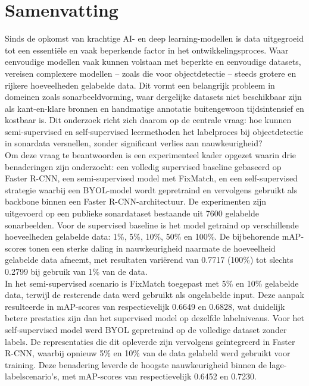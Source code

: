 
\chapter*{Samenvatting}

Sinds de opkomst van krachtige AI- en deep learning-modellen is data uitgegroeid tot een essentiële en vaak beperkende factor in het ontwikkelingsproces. Waar eenvoudige modellen vaak kunnen volstaan met beperkte en eenvoudige datasets, vereisen complexere modellen -- zoals die voor objectdetectie -- steeds grotere en rijkere hoeveelheden gelabelde data. Dit vormt een belangrijk probleem in domeinen zoals sonarbeeldvorming, waar dergelijke datasets niet beschikbaar zijn als kant-en-klare bronnen en handmatige annotatie buitengewoon tijdsintensief en kostbaar is. Dit onderzoek richt zich daarom op de centrale vraag: hoe kunnen semi-supervised en self-supervised leermethoden het labelproces bij objectdetectie in sonardata versnellen, zonder significant verlies aan nauwkeurigheid? \\

Om deze vraag te beantwoorden is een experimenteel kader opgezet waarin drie benaderingen zijn onderzocht: een volledig supervised baseline gebaseerd op Faster R-CNN, een semi-supervised model met FixMatch, en een self-supervised strategie waarbij een BYOL-model wordt gepretraind en vervolgens gebruikt als backbone binnen een Faster R-CNN-architectuur. De experimenten zijn uitgevoerd op een publieke sonardataset bestaande uit 7600 gelabelde sonarbeelden. Voor de supervised baseline is het model getraind op verschillende hoeveelheden gelabelde data: 1\%, 5\%, 10\%, 50\% en 100\%. De bijbehorende mAP-scores tonen een sterke daling in nauwkeurigheid naarmate de hoeveelheid gelabelde data afneemt, met resultaten variërend van 0.7717 (100\%) tot slechts 0.2799 bij gebruik van 1\% van de data. \\

In het semi-supervised scenario is FixMatch toegepast met 5\% en 10\% gelabelde data, terwijl de resterende data werd gebruikt als ongelabelde input. Deze aanpak resulteerde in mAP-scores van respectievelijk 0.6649 en 0.6828, wat duidelijk betere prestaties zijn dan het supervised model op dezelfde labelniveaus. Voor het self-supervised model werd BYOL gepretraind op de volledige dataset zonder labels. De representaties die dit opleverde zijn vervolgens geïntegreerd in Faster R-CNN, waarbij opnieuw 5\% en 10\% van de data gelabeld werd gebruikt voor training. Deze benadering leverde de hoogste nauwkeurigheid binnen de lage-labelscenario's, met mAP-scores van respectievelijk 0.6452 en 0.7230.

